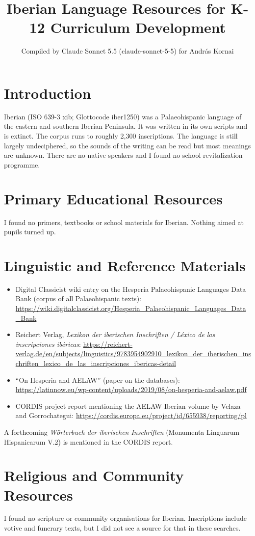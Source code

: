 \documentclass[12pt]{article}
\title{Iberian Language Resources for K-12 Curriculum Development}
\author{Compiled by Claude Sonnet 5.5 (claude-sonnet-5-5) for Andr\'as Kornai}
\date{}
\begin{document}
\maketitle

\section{Introduction}
Iberian (ISO 639-3 xib; Glottocode iber1250) was a Palaeohispanic language of the eastern and southern Iberian Peninsula. It was written in its own scripts and is extinct. The corpus runs to roughly 2,300 inscriptions. The language is still largely undeciphered, so the sounds of the writing can be read but most meanings are unknown. There are no native speakers and I found no school revitalization programme.

\section{Primary Educational Resources}
I found no primers, textbooks or school materials for Iberian. Nothing aimed at pupils turned up.

\section{Linguistic and Reference Materials}
\begin{itemize}
\item Digital Classicist wiki entry on the Hesperia Palaeohispanic Languages Data Bank (corpus of all Palaeohispanic texts): \url{https://wiki.digitalclassicist.org/Hesperia_Palaeohispanic_Languages_Data_Bank}
\item Reichert Verlag, \emph{Lexikon der iberischen Inschriften / L\'exico de las inscripciones ib\'ericas}: \url{https://reichert-verlag.de/en/subjects/linguistics/9783954902910_lexikon_der_iberischen_inschriften_lexico_de_las_inscripciones_ibericas-detail}
\item ``On Hesperia and AELAW'' (paper on the databases): \url{https://latinnow.eu/wp-content/uploads/2019/08/on-hesperia-and-aelaw.pdf}
\item CORDIS project report mentioning the AELAW Iberian volume by Velaza and Gorrochategui: \url{https://cordis.europa.eu/project/id/655938/reporting/pl}
\end{itemize}
A forthcoming \emph{W\"orterbuch der iberischen Inschriften} (Monumenta Linguarum Hispanicarum V.2) is mentioned in the CORDIS report.

\section{Religious and Community Resources}
I found no scripture or community organisations for Iberian. Inscriptions include votive and funerary texts, but I did not see a source for that in these searches.
\end{document}
